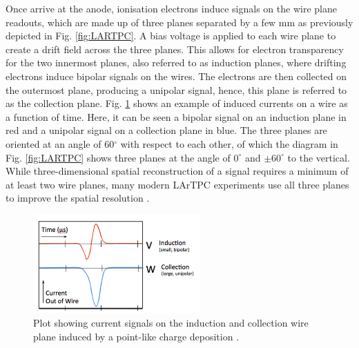 Once arrive at the anode, ionisation electrons induce signals on the wire plane readouts, which are made up of three planes separated by a few mm as previously depicted in Fig. \ref{fig:LARTPC}.
A bias voltage is applied to each wire plane to create a drift field across the three planes.
This allows for electron transparency for the two innermost planes, also referred to as induction planes, where drifting electrons induce bipolar signals on the wires.
The electrons are then collected on the outermost plane, producing a unipolar signal, hence, this plane is referred to as the collection plane.
Fig. \ref{fig:wire_current} shows an example of induced currents on a wire as a function of time.
Here, it can be seen a bipolar signal on an induction plane in red and a unipolar signal on a collection plane in blue.
The three planes are oriented at an angle of 60$^{\circ}$ with respect to each other, of which the diagram in Fig. \ref{fig:LARTPC} shows three planes at the angle of $0^{\circ}$ and $\pm60^{\circ}$ to the vertical.                                                                                                                                                                                          
While three-dimensional spatial reconstruction of a signal requires a minimum of at least two wire planes, many modern LArTPC experiments use all three planes to improve the spatial resolution \cite{argoneut, icarus_det, ubooneDet, sbnd_det, protodune, dunefd_det}.

\begin{figure}[ht] 
\centering    
\includegraphics[width=0.57\textwidth]{wire_current}
\caption[wire_current]{
Plot showing current signals on the induction and collection wire plane induced by a point-like charge deposition \cite{argoneut}.
\hfill
\break
}
\label{fig:wire_current}
\end{figure}


